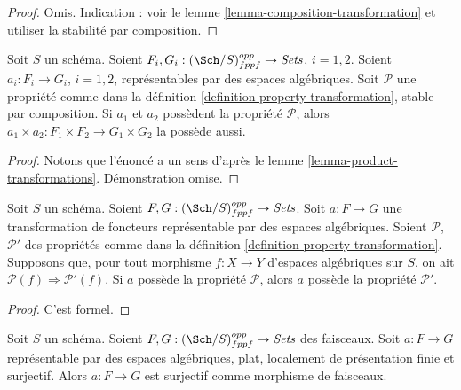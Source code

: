 \begin{proof}
Omis. Indication : voir le
lemme \ref{lemma-composition-transformation}
et utiliser la stabilité par composition.
\end{proof}

\begin{lemma}
\label{lemma-product-transformations-property}
Soit $S$ un schéma.
Soient $F_i, G_i : (\Sch/S)_{fppf}^{opp} \to \textit{Sets}$,
$i = 1, 2$.
Soient $a_i : F_i \to G_i$, $i = 1, 2$, représentables par des espaces algébriques.
Soit $\mathcal{P}$ une propriété comme dans la
définition \ref{definition-property-transformation},
stable par composition.
Si $a_1$ et $a_2$ possèdent la propriété $\mathcal{P}$, alors
$a_1 \times a_2 : F_1 \times F_2 \longrightarrow G_1 \times G_2$ la possède aussi.
\end{lemma}

\begin{proof}
Notons que l'énoncé a un sens d'après le
lemme \ref{lemma-product-transformations}.
Démonstration omise.
\end{proof}

\begin{lemma}
\label{lemma-transformations-property-implication}
Soit $S$ un schéma.
Soient $F, G : (\Sch/S)_{fppf}^{opp} \to \textit{Sets}$.
Soit $a : F \to G$ une transformation de foncteurs représentable par
des espaces algébriques.
Soient $\mathcal{P}$, $\mathcal{P}'$ des propriétés comme dans la
définition \ref{definition-property-transformation}.
Supposons que, pour tout morphisme $f : X \to Y$ d'espaces algébriques sur $S$,
on ait $\mathcal{P}(f) \Rightarrow \mathcal{P}'(f)$.
Si $a$ possède la propriété $\mathcal{P}$, alors
$a$ possède la propriété $\mathcal{P}'$.
\end{lemma}

\begin{proof}
C'est formel.
\end{proof}

\begin{lemma}
\label{lemma-surjective-flat-locally-finite-presentation}
Soit $S$ un schéma.
Soient $F, G : (\Sch/S)_{fppf}^{opp} \to \textit{Sets}$ des faisceaux.
Soit $a : F \to G$ représentable par des espaces algébriques, plat,
localement de présentation finie et surjectif.
Alors $a : F \to G$ est surjectif comme morphisme de faisceaux.
\end{lemma}

